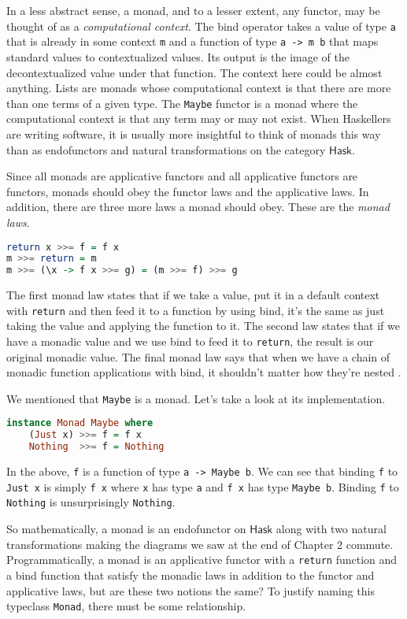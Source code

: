 \documentclass[MS, xcolor=dvipsnames]{wfuthesis}
\def\Hask{\mathsf{Hask}}
\theoremstyle{definition}
\begin{document}
In a less abstract sense, a monad, and to a lesser extent, any functor, may be thought of as a \emph{computational context}. The bind operator takes a value of type \lstinline{a} that is already in some context \lstinline{m} and a function of type \lstinline{a -> m b} that maps standard values to contextualized values. Its output is the image of the decontextualized value under that function. The context here could be almost anything. Lists are monads whose computational context is that there are more than one terms of a given type. The \lstinline{Maybe} functor is a monad where the computational context is that any term may or may not exist. When Haskellers are writing software, it is usually more insightful to think of monads this way than as endofunctors and natural transformations on the category $\Hask$. \par
Since all monads are applicative functors and all applicative functors are functors, monads should obey the functor laws and the applicative laws. In addition, there are three more laws a monad should obey. These are the \emph{monad laws}.
\begin{lstlisting}[language=Haskell]
return x >>= f = f x
m >>= return = m
m >>= (\x -> f x >>= g) = (m >>= f) >>= g
\end{lstlisting}
The first monad law states that if we take a value, put it in a default context with \lstinline{return} and then feed it to a function by using bind, it's the same as just taking the value and applying the function to it. The second law states that if we have a monadic value and we use bind to feed it to \lstinline{return}, the result is our original monadic value. The final monad law says that when we have a chain of monadic function applications with bind, it shouldn't matter how they're nested \cite{Lipovaca2011}. \par
We mentioned that \lstinline{Maybe} is a monad. Let's take a look at its implementation.
\begin{lstlisting}[language=Haskell]
instance Monad Maybe where
    (Just x) >>= f = f x
    Nothing  >>= f = Nothing
\end{lstlisting}
In the above, \lstinline{f} is a function of type \lstinline{a -> Maybe b}. We can see that binding \lstinline{f} to \lstinline{Just x} is simply \lstinline{f x} where \lstinline{x} has type \lstinline{a} and \lstinline{f x} has type \lstinline{Maybe b}. Binding \lstinline{f} to \lstinline{Nothing} is unsurprisingly \lstinline{Nothing}. \par
So mathematically, a monad is an endofunctor on $\Hask$ along with two natural transformations making the diagrams we saw at the end of Chapter 2 commute. Programmatically, a monad is an applicative functor with a \lstinline{return} function and a bind function that satisfy the monadic laws in addition to the functor and applicative laws, but are these two notions the same? To justify naming this typeclass \lstinline{Monad}, there must be some relationship. \par
\end{document}
